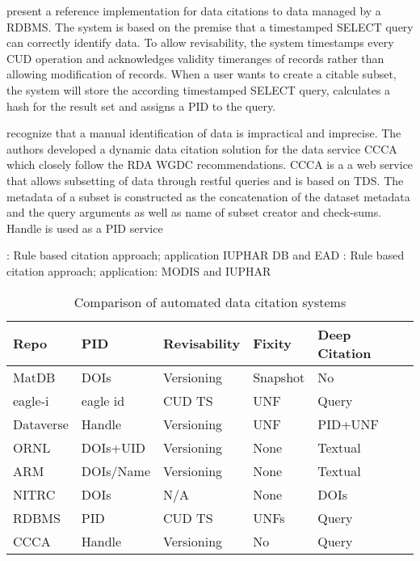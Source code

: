 \documentclass[letterpaper, parskip=half]{scrartcl}
\begin{document}
\cite{Proll2013} present a reference implementation for data citations to data managed by a \gls{RDBMS}. 
The system is based on the premise that a timestamped SELECT query can correctly identify data. To allow revisability, the system timestamps every \gls{CUD} operation and acknowledges validity timeranges of records rather than allowing modification of records. When a user wants to create a citable subset, the system will store the according timestamped SELECT query, calculates a hash for the result set and assigns a PID to the query. 

\cite{Schubert2019} recognize that a manual identification of data is impractical and imprecise. The authors developed a dynamic data citation solution for the data service \gls{CCCA} which closely follow the \gls{RDA} \gls{WGDC} \citep{Rauber2015, Rauber2015} recommendations. CCCA is a a web service that allows subsetting of data through restful queries and is based on \gls{TDS}.
The metadata of a subset is constructed as the concatenation of the dataset metadata and the query arguments as well as name of subset creator and check-sums. 
Handle is used as a PID service


\citep{Buneman2010}: Rule based citation approach; application IUPHAR DB and EAD
\citep{Buneman2016}: Rule based citation approach; application: MODIS and IUPHAR 

\begin{table}
\caption{Comparison of automated data citation systems}
\begin{tabular}{l l l l l}
\toprule
    Repo        & PID           & Revisability   & Fixity   & Deep Citation \\\midrule
    MatDB       & DOIs          & Versioning     & Snapshot & No  \\
    eagle-i     & eagle id      & CUD TS         & UNF      & Query\\
    Dataverse   & Handle        & Versioning     & UNF      & PID+UNF \\ 
    ORNL        & DOIs+UID      & Versioning     & None     & Textual \\
    ARM         & DOIs/Name     & Versioning     & None     & Textual \\
    NITRC       & DOIs          & N/A            & None     & DOIs  \\
    RDBMS       & PID           & CUD TS         & UNFs     & Query \\
    CCCA        & Handle        & Versioning    & No       & Query \\
\bottomrule     
\end{tabular}
\label{tab_citcomp}
\end{table}
\end{document}
